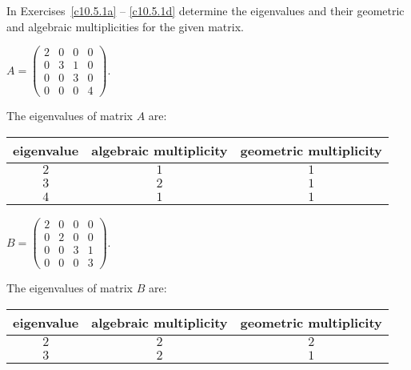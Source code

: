 \documentclass{ximera}
\begin{document}
\noindent In Exercises~\ref{c10.5.1a} -- \ref{c10.5.1d} determine the 
eigenvalues and their geometric and algebraic multiplicities for the 
given matrix.
\begin{exercise} \label{c10.5.1a}
$A = \left(\begin{array}{cccc} 2 & 0 &  0 & 0\\ 0 & 3 & 1 & 0 \\
0 & 0 & 3 & 0 \\ 0 & 0 & 0 & 4 \end{array}\right)$.

\begin{solution}
The eigenvalues of matrix $A$ are:
\begin{center}
\begin{tabular}{|c|c|c|}
\hline
eigenvalue & algebraic multiplicity & geometric multiplicity \\
\hline
$2$ & $1$ & $1$ \\
$3$ & $2$ & $1$ \\
$4$ & $1$ & $1$ \\
\hline
\end{tabular}
\end{center}


\end{solution}
\end{exercise}
\begin{exercise} \label{c10.5.1b}
$B = \left(\begin{array}{cccc} 2 & 0 &  0 & 0\\ 0 & 2 & 0 & 0 \\
0 & 0 & 3 & 1 \\ 0 & 0 & 0 & 3 \end{array}\right)$.

\begin{solution}
The eigenvalues of matrix $B$ are:
\begin{center}
\begin{tabular}{|c|c|c|}
\hline
eigenvalue & algebraic multiplicity & geometric multiplicity \\
\hline
$2$ & $2$ & $2$ \\
$3$ & $2$ & $1$ \\
\hline
\end{tabular}
\end{center}

\end{solution}
\end{exercise}
\end{document}
